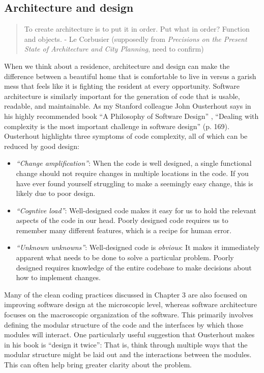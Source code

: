 \subsection{Architecture and design}

\begin{quote}
To create architecture is to put it in order. Put what in order? Function and objects. - Le Corbusier (supposedly from \textit{Precisions on the Present State of Architecture and City Planning}, need to confirm)
\end{quote}

When we think about a residence, architecture and design can make the difference between a beautiful home that is comfortable to live in versus a garish mess that feels like it is fighting the resident at every opportunity. Software architecture is similarly important for the generation of code that is usable, readable, and maintainable.  As my Stanford colleague John Ousterhout says in his highly recommended book ``A Philosophy of Software Design'' \citep{Ousterhout:2021aa}, ``Dealing with complexity is the most important challenge in software design'' (p. 169).  Ousterhout highlights three symptoms of code complexity, all of which can be reduced by good design:

\begin{itemize}
\item \textit{``Change amplification''}: When the code is well designed, a single functional change should not require changes in multiple locations in the code.  If you have ever found yourself struggling to make a seemingly easy change, this is likely due to poor design.
\item \textit{``Cogntive load''}: Well-designed code makes it easy for us to hold the relevant aspects of the code in our head.  Poorly designed code requires us to remember many different features, which is a recipe for human error.
\item \textit{``Unknown unknowns''}: Well-designed code is \textit{obvious}:  It makes it immediately apparent what needs to be done to solve a particular problem.  Poorly designed requires knowledge of the entire codebase to make decisions about how to implement changes.
\end{itemize}

Many of the clean coding practices discussed in Chapter 3 are also focused on improving software design at the microscopic level, whereas software architecture focuses on the macroscopic organization of the software. This primarily involves defining the modular structure of the code and the interfaces by which those modules will interact.  One particularly useful suggestion that Ousterhout makes in his book is ``design it twice'': That is, think through multiple ways that the modular structure might be laid out and the interactions between the modules. This can often help bring greater clarity about the problem.

